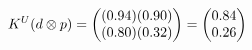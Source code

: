 \documentclass[preview]{standalone}
\begin{document}
\begin{align*}
\special{dvisvgm:raw <g id='unique000'>}K^U(d \otimes p) = \begin{pmatrix} (0.94)(0.90) \\ (0.80)(0.32) \end{pmatrix} = \begin{pmatrix} 0.84 \\ 0.26 \end{pmatrix}\special{dvisvgm:raw </g>}
\end{align*}
\end{document}
